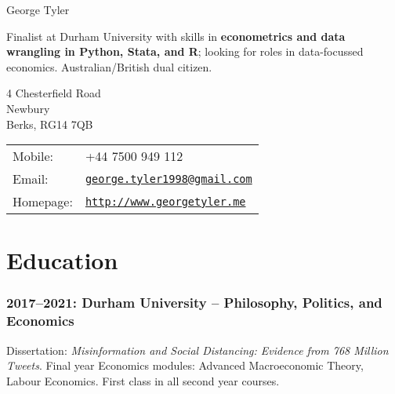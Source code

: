 \documentclass[a4]{article}
\def\name{George Tyler}
\renewenvironment{itemize}{
  \begin{list}{}{
    \setlength{\leftmargin}{1.5em}
  }
}{
  \end{list}
}
\begin{document}
{\huge \name}


\vspace{0.25in}

Finalist at Durham University with skills in \textbf{econometrics and data wrangling in Python, Stata, and R}; looking for roles in data-focussed economics. Australian/British dual citizen. 

\vspace{0.25in}

\begin{minipage}{0.45\linewidth}
  4 Chesterfield Road \\
  Newbury \\
  Berks, RG14 7QB
\end{minipage}
\begin{minipage}{0.45\linewidth}
  \begin{tabular}{ll}
    Mobile: & +44 7500 949 112 \\
    Email: & \href{mailto:george.tyler1998@gmail.com}{\tt george.tyler1998@gmail.com} \\
    Homepage: & \href{http://www.georgetyler.me}{\tt http://www.georgetyler.me} \\
  \end{tabular}
\end{minipage}





\section*{Education}

\subsubsection*{2017--2021: Durham University -- Philosophy, Politics, and Economics}
Dissertation: \textit{Misinformation and Social Distancing: Evidence from 768 Million Tweets}. Final year Economics modules: Advanced Macroeconomic Theory, Labour Economics. First class in all second year courses.%
\end{document}
